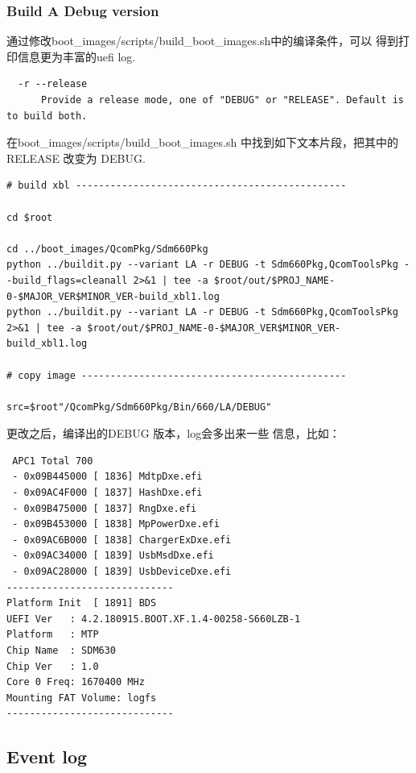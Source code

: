 \subsubsection{Build A Debug version}


通过修改boot\_images/scripts/build\_boot\_images.sh中的编译条件，可以
得到打印信息更为丰富的uefi log.

\begin{lstlisting}
  -r --release
      Provide a release mode, one of "DEBUG" or "RELEASE". Default is to build both.
\end{lstlisting}



在boot\_images/scripts/build\_boot\_images.sh 中找到如下文本片段，把其中的 RELEASE 改变为 DEBUG.
\begin{lstlisting}
# build xbl -----------------------------------------------

cd $root

cd ../boot_images/QcomPkg/Sdm660Pkg
python ../buildit.py --variant LA -r DEBUG -t Sdm660Pkg,QcomToolsPkg --build_flags=cleanall 2>&1 | tee -a $root/out/$PROJ_NAME-0-$MAJOR_VER$MINOR_VER-build_xbl1.log
python ../buildit.py --variant LA -r DEBUG -t Sdm660Pkg,QcomToolsPkg 2>&1 | tee -a $root/out/$PROJ_NAME-0-$MAJOR_VER$MINOR_VER-build_xbl1.log

# copy image ----------------------------------------------

src=$root"/QcomPkg/Sdm660Pkg/Bin/660/LA/DEBUG"
\end{lstlisting}




更改之后，编译出的DEBUG 版本，log会多出来一些
信息，比如：

\begin{lstlisting}
 APC1 Total 700
 - 0x09B445000 [ 1836] MdtpDxe.efi
 - 0x09AC4F000 [ 1837] HashDxe.efi
 - 0x09B475000 [ 1837] RngDxe.efi
 - 0x09B453000 [ 1838] MpPowerDxe.efi
 - 0x09AC6B000 [ 1838] ChargerExDxe.efi
 - 0x09AC34000 [ 1839] UsbMsdDxe.efi
 - 0x09AC28000 [ 1839] UsbDeviceDxe.efi
-----------------------------
Platform Init  [ 1891] BDS
UEFI Ver   : 4.2.180915.BOOT.XF.1.4-00258-S660LZB-1
Platform   : MTP
Chip Name  : SDM630
Chip Ver   : 1.0
Core 0 Freq: 1670400 MHz
Mounting FAT Volume: logfs
-----------------------------
\end{lstlisting}







\subsection{Event log}

